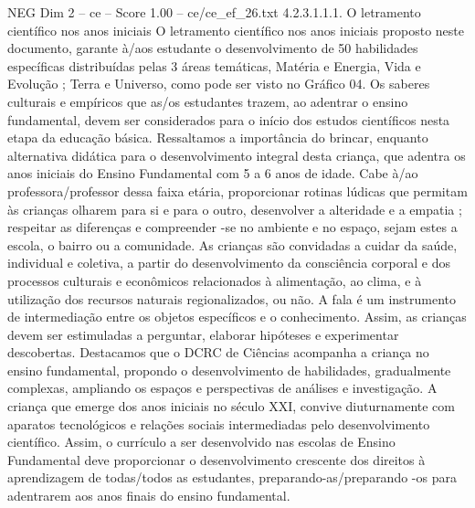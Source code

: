 \begin{textsample}{NEG Dim 2 – ce – Score 1.00 – ce/ce\_ef\_26.txt}  \label{ex:f2_neg_206}
4.2.3.1.1.1.
O letramento científico nos anos iniciais O letramento científico nos anos iniciais proposto neste documento, garante à/aos estudante o desenvolvimento de 50 habilidades específicas distribuídas pelas 3 áreas temáticas, Matéria e Energia, Vida e Evolução ; Terra e Universo, como pode ser visto no Gráfico 04.
Os saberes culturais e empíricos que as/os estudantes trazem, ao adentrar o ensino fundamental, devem ser considerados para o início dos estudos científicos nesta etapa da educação básica.
Ressaltamos a importância do brincar, enquanto alternativa didática para o desenvolvimento integral desta criança, que adentra os anos iniciais do Ensino Fundamental com 5 a 6 anos de idade.
Cabe à/ao professora/professor dessa faixa etária, proporcionar rotinas lúdicas que permitam às crianças olharem para si e para o outro, desenvolver a alteridade e a empatia ; respeitar as diferenças e compreender -se no ambiente e no espaço, sejam estes a escola, o bairro ou a comunidade.
As crianças são convidadas a cuidar da saúde, individual e coletiva, a partir do desenvolvimento da consciência corporal e dos processos culturais e econômicos relacionados à alimentação, ao clima, e à utilização dos recursos naturais regionalizados, ou não.
A fala é um instrumento de intermediação entre os objetos específicos e o conhecimento.
Assim, as crianças devem ser estimuladas a perguntar, elaborar hipóteses e experimentar descobertas.
Destacamos que o DCRC de Ciências acompanha a criança no ensino fundamental, propondo o desenvolvimento de habilidades, gradualmente complexas, ampliando os espaços e perspectivas de análises e investigação.
A criança que emerge dos anos iniciais no século XXI, convive diuturnamente com aparatos tecnológicos e relações sociais intermediadas pelo desenvolvimento científico.
Assim, o currículo a ser desenvolvido nas escolas de Ensino Fundamental deve proporcionar o desenvolvimento crescente dos direitos à aprendizagem de todas/todos as estudantes, preparando-as/preparando -os para adentrarem aos anos finais do ensino fundamental.

\end{textsample}
